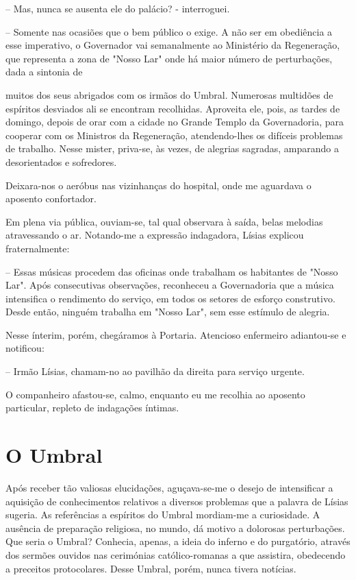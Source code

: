 \documentclass[portuguese,12pt,a4paper]{scrbook}
\begin{document}
	– Mas, nunca se ausenta ele do palácio? - interroguei.
	
	– Somente nas ocasiões que o bem público o exige. A não ser em obediência a esse imperativo, o Governador vai semanalmente ao Ministério da Regeneração, que representa a zona de "Nosso Lar" onde há maior número de perturbações, dada a sintonia de
	
	
	muitos dos seus abrigados com os irmãos do Umbral. Numerosas multidões de espíritos desviados ali se encontram recolhidas. Aproveita ele, pois, as tardes de domingo, depois de orar com a cidade no Grande Templo da Governadoria, para cooperar com os Ministros da Regeneração, atendendo-lhes os difíceis problemas de trabalho. Nesse mister, priva-se, às vezes, de alegrias sagradas, amparando a desorientados e sofredores.
	
	Deixara-nos o aeróbus nas vizinhanças do hospital, onde me aguardava o aposento confortador.
	
	Em plena via pública, ouviam-se, tal qual observara à saída, belas melodias atravessando o ar. Notando-me a expressão indagadora, Lísias explicou fraternalmente:
	
	– Essas músicas procedem das oficinas onde trabalham os habitantes de "Nosso Lar". Após consecutivas observações, reconheceu a Governadoria que a música intensifica o rendimento do serviço, em todos os setores de esforço construtivo. Desde então, ninguém trabalha em "Nosso Lar", sem esse estímulo de alegria.
	
	Nesse ínterim, porém, chegáramos à Portaria. Atencioso enfermeiro adiantou-se e notificou:
	
	– Irmão Lísias, chamam-no ao pavilhão da direita para serviço urgente.
	
	O companheiro afastou-se, calmo, enquanto eu me recolhia ao aposento particular, repleto de indagações íntimas.
	
	
	\chapter{O Umbral}
	
	Após receber tão valiosas elucidações, aguçava-se-me o desejo de intensificar a aquisição de conhecimentos relativos a diversos problemas que a palavra de Lísias sugeria. As referências a espíritos do Umbral mordiam-me a curiosidade. A ausência de preparação religiosa, no mundo, dá motivo a dolorosas perturbações. Que seria o Umbral? Conhecia, apenas, a ideia do inferno e do purgatório, através dos sermões ouvidos nas cerimónias católico-romanas a que assistira, obedecendo a preceitos protocolares. Desse Umbral, porém, nunca tivera notícias.
	
\end{document}
